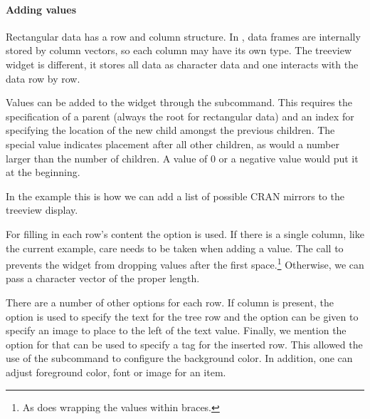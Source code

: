\paragraph{Adding values}

Rectangular data has a row and column structure. In \R, data frames
are internally stored by column vectors, so each column may have its
own type. The treeview widget is different, it stores all data as
character data and one interacts with the data row by row.

Values can be added to the widget through the
subcommand. This requires the specification of a parent (always the root
\qcode{} for rectangular data) and an index for specifying the
location of the new child amongst the previous children. The special
value  indicates placement after all other children, as
would a number larger than the number of children. A value of 0 or a
negative value would put it at the beginning.


In the example this is how we can add a list of possible CRAN mirrors
to the treeview display.
\begin{Schunk}
\end{Schunk}

For filling in each row's content the  option is used. If
there is a single column, like the current example, care needs to be
taken when adding a value. The call to  prevents
the widget from dropping values after the first space.\footnote{As
  does wrapping the values within braces.} Otherwise, we can pass a
character vector of the proper length.


There are a number of other options for each row. If column 
is present, the  option is used to specify the text for the
tree row and the option  can be given to specify an image
to place to the left of the text value. Finally, we mention the
 option for  that can be used to specify a tag
for the inserted row. This allowed the use of the subcommand
 to configure the background
color. In addition, one can adjust foreground color, font or image for
an item.



